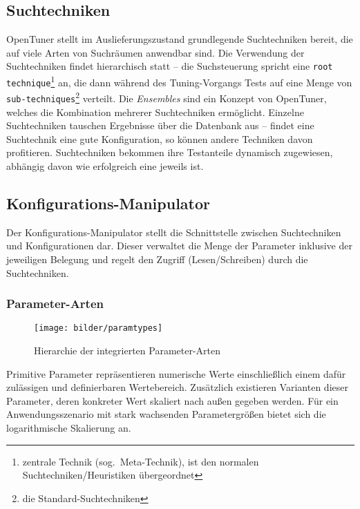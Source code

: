 \documentclass[a4paper,11pt]{scrartcl}
\begin{document}

\subsection{Suchtechniken}
OpenTuner stellt im Auslieferungszustand grundlegende Suchtechniken bereit, die auf viele Arten von 
Suchräumen anwendbar sind. Die Verwendung der Suchtechniken findet hierarchisch statt --
die Suchsteuerung spricht eine \texttt{root technique}\footnote{zentrale Technik (sog.~Meta-Technik),
ist den normalen Suchtechniken/Heuristiken übergeordnet} an, die dann während des Tuning-Vorgangs 
Tests auf eine Menge von \texttt{sub-techniques}\footnote{die Standard-Suchtechniken} verteilt. 
Die \emph{Ensembles} sind ein Konzept von OpenTuner, welches die Kombination mehrerer Suchtechniken
ermöglicht. Einzelne Suchtechniken tauschen Ergebnisse über die Datenbank aus -- findet eine 
Suchtechnik eine gute Konfiguration, so können andere Techniken davon profitieren.
Suchtechniken bekommen ihre Testanteile dynamisch zugewiesen, abhängig davon wie erfolgreich eine
jeweils ist.

\subsection{Konfigurations-Manipulator}
Der Konfigurations-Manipulator stellt die Schnittstelle zwischen Suchtechniken und Konfigurationen
dar. Dieser verwaltet die Menge der Parameter inklusive der jeweiligen Belegung und regelt den Zugriff
(Lesen/Schreiben) durch die Suchtechniken.

\subsubsection{Parameter-Arten}

\begin{figure}[h]
\begin{center}
\texttt{[image: bilder/paramtypes]}
\cite{OT-paper} \caption{Hierarchie der integrierten Parameter-Arten} 
\end{center}
\end{figure}

Primitive Parameter repräsentieren numerische Werte einschließlich einem dafür
zulässigen und definierbaren Wertebereich. Zusätzlich existieren Varianten dieser Parameter,
deren konkreter Wert skaliert nach außen gegeben werden. Für ein Anwendungsszenario mit 
stark wachsenden Parametergrößen bietet sich die logarithmische Skalierung an. 
\end{document}
